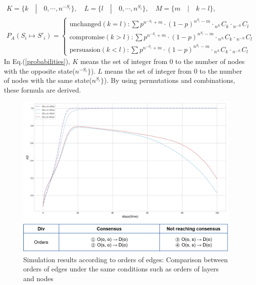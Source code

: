\begin{equation}
\begin{array}{l}
K = \{ k \quad|\quad 0, \cdots ,{n^{ - {S_i}}}\}, \quad L = \{l \quad|\quad 0, \cdots ,{n^{{S_i}}}\},
\quad M = \{m \quad|\quad k-l\}, \\
{P_A}({S_i} \mapsto {{S'}_i}) = \begin{cases}
\mbox{unchanged}(k = l):\sum {{p^{{n^{ - {S_i}}}+m}} \cdot {{(1 - p)}^{{n^{{S_i}}}-m}} \cdot {}_{{n^{{S_{^i}}}}}{C_k} \cdot {}_{{n^{ - {S_{^i}}}}}{C_l}} \\
\mbox{compromise}(k > l):\sum {{p^{{n^{ - {S_i}}}+m}} \cdot {{(1 - p)}^{{n^{{S_i}}}-m}} \cdot {}_{{n^{{S_{^i}}}}}{C_k} \cdot {}_{{n^{ - {S_{^i}}}}}{C_l}} \\
\mbox{persuasion}(k < l):\sum {{p^{{n^{ - {S_i}}}+m}} \cdot {{(1 - p)}^{{n^{{S_i}}}-m}} \cdot {}_{{n^{{S_{^i}}}}}{C_k} \cdot {}_{{n^{ - {S_{^i}}}}}{C_l}} 
\end{cases}
\end{array}
\label{probabilities}
\end{equation}
In Eq.(\ref{probabilities}), $K$ means the set of integer from 0 to the number of nodes with the opposite state(${n^{ - {S_i}}}\}$). $L$ means the set of integer from 0 to the number of nodes with the same state(${n^{{S_i}}}\}$). By using permutations and combinations, these formula are derived.

\begin{figure}[!htb]
	\centering
	\includegraphics[width=\hsize]{figure/chap4_edgeorder.png}
	\caption{Simulation results according to orders of edges: Comparison between orders of edges under the same conditions such as orders of layers and nodes}
	\label{edgeorder}
\end{figure}

